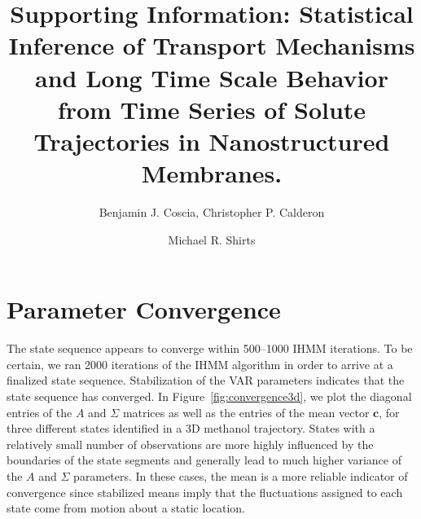 \documentclass{article}
\title{Supporting Information: Statistical Inference of Transport Mechanisms and Long Time Scale 
	   Behavior from Time Series of Solute Trajectories in Nanostructured Membranes.}
\author{Benjamin J. Coscia, Christopher P. Calderon \and Michael R. Shirts}
\begin{document}
  \graphicspath{{./supporting_figures/}}
  \maketitle
  \tableofcontents
  
  \section{Parameter Convergence}\label{section:convergence}
  
  The state sequence appears to converge within 500--1000 IHMM iterations. To
  be certain, we ran 2000 iterations of the IHMM algorithm in order to arrive at a 
  finalized state sequence. Stabilization of the VAR parameters indicates 
  that the state sequence has converged. In Figure~\ref{fig:convergence3d}, we plot
  the diagonal entries of the $A$ and $\Sigma$ matrices as well as the entries of
  the mean vector $\mathbf{c}$, for three different states identified in a 3D 
  methanol trajectory. States with a relatively small number of observations are
  more highly influenced by the boundaries of the state segments and generally 
  lead to much higher variance of the $A$ and $\Sigma$ parameters. In these cases,
  the mean is a more reliable indicator of convergence since stabilized means 
  imply that the fluctuations assigned to each state come from motion about a 
  static location.
  
\end{document}
